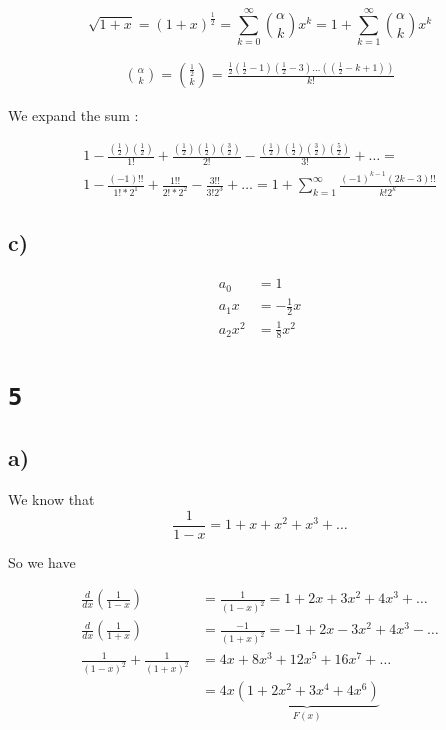 \documentclass[a4paper,11pt]{report}
\begin{document}
\[
  \sqrt{1+x} = (1+x)^{\frac{1}{2}} = \sum_{k=0}^\infty \binom{\alpha}{k}x^k = 1
  + \sum_{k=1}^\infty \binom{\alpha}{k}x^k
\]

\begin{align*}
  \binom{\alpha}{k} = \binom{\frac{1}{2}}{k}
  = \frac{\frac{1}{2} (\frac{1}{2} - 1) (\frac{1}{2} - 3) \dots ((\frac{1}{2} - k + 1))}{k!}
\end{align*}

We expand the sum :

\begin{gather*}
  1 - \frac{(\frac{1}{2}) (\frac{1}{2})}{1!} + \frac{(\frac{1}{2})
    (\frac{1}{2})(\frac{3}{2})}{2!} - \frac{(\frac{1}{2})
    (\frac{1}{2})(\frac{3}{2})(\frac{5}{2})}{3!} + \dots = \\
  1 - \frac{(-1)!!}{1! * 2^1} + \frac{1!!}{2! * 2^2} - \frac{3!!}{3! 2^3} +
  \dots =
  1 + \sum_{k=1}^{\infty} \frac{(-1)^{k-1} (2k-3)!!}{k! 2^k}
\end{gather*}

\subsection*{c)}

\begin{align*}
  a_0 &= 1 \\
  a_1x &= -\frac{1}{2} x \\
  a_2x^2 &= \frac{1}{8} x^2 
\end{align*}

\section*{\texttt{5}}

\subsection*{a)}

We know that
\[
  \frac{1}{1-x} = 1 + x + x^2 + x^3 + \dots
\]

So we have

\begin{align*}
  \frac{d}{dx} (\frac{1}{1-x}) &= \frac{1}{(1-x)^2} = 1 + 2x + 3x^2 + 4x^3 + \dots \\
  \frac{d}{dx} (\frac{1}{1+x}) &= \frac{-1}{(1+x)^2} = -1 + 2x - 3x^2 + 4x^3 - \dots \\
  \frac{1}{(1-x)^2} + \frac{1}{(1+x)^2}&= 4x + 8x^3 + 12x^5 + 16x^7 + \dots \\ 
                               &= 4x\underbrace{(1 + 2x^2 + 3x^4 + 4x^6)}_{F(x)} \\
\end{align*}
\end{document}
